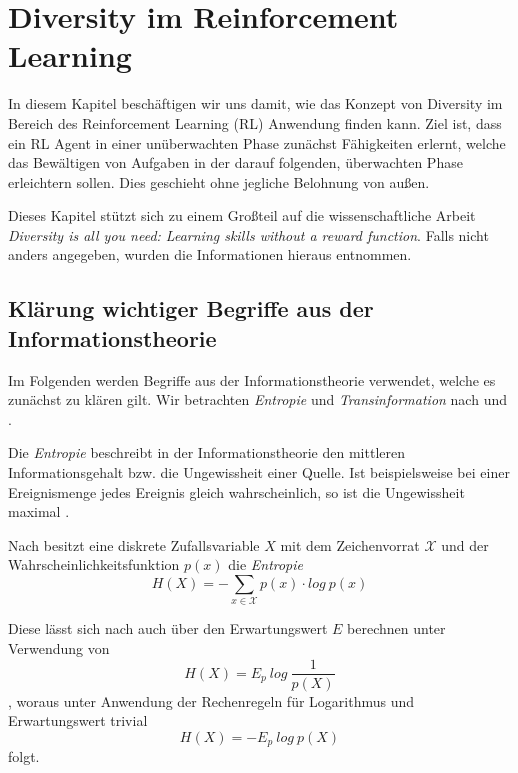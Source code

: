 \section{Diversity im Reinforcement Learning}
\label{sec:diversity}
In diesem Kapitel beschäftigen wir uns damit, wie das Konzept von Diversity im Bereich des Reinforcement Learning (RL) Anwendung finden kann. Ziel ist, dass ein RL Agent in einer unüberwachten Phase zunächst Fähigkeiten erlernt, welche das Bewältigen von Aufgaben in der darauf folgenden, überwachten Phase erleichtern sollen. Dies geschieht ohne jegliche Belohnung von außen.

Dieses Kapitel stützt sich zu einem Großteil auf die wissenschaftliche Arbeit \textit{Diversity is all you need: Learning skills without a reward function}\cite{diversity_eysenbach}. Falls nicht anders angegeben, wurden die Informationen hieraus entnommen.

\subsection{Klärung wichtiger Begriffe aus der Informationstheorie}
\label{sec:informationtheory}
Im Folgenden werden Begriffe aus der Informationstheorie verwendet, welche es zunächst zu klären gilt. Wir betrachten \textit{Entropie} und \textit{Transinformation} nach \cite{elements_cover} und \cite{information_werner}.

\smallspace

Die \textit{Entropie} beschreibt in der Informationstheorie den mittleren Informationsgehalt bzw. die Ungewissheit einer Quelle. Ist beispielsweise bei einer Ereignismenge jedes Ereignis gleich wahrscheinlich, so ist die Ungewissheit maximal \cite{information_werner}.

Nach \cite{elements_cover} besitzt eine diskrete Zufallsvariable $ X $ mit dem Zeichenvorrat $ \mathcal{X} $ und der Wahrscheinlichkeitsfunktion $ p(x) $ die \textit{Entropie}
\begin{equation*}
    H(X) = -\sum_{x \in \mathcal{X}} p(x) \cdot log\ p(x) \label{eq:entropy}
\end{equation*}

Diese lässt sich nach \cite{elements_cover} auch über den Erwartungswert $ E $ berechnen unter Verwendung von
\begin{equation*}
    H(X) = E_p\ log\ \frac{1}{p(X)} \label{eq:entropy_1}
\end{equation*}
, woraus unter Anwendung der Rechenregeln für Logarithmus und Erwartungswert trivial
\begin{equation}
    H(X) = - E_p\ log\ p(X) \label{eq:entropy_2}
\end{equation}
folgt.

